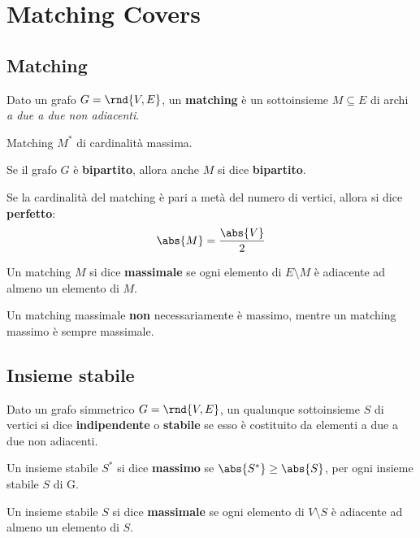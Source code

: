 \documentclass[\main/main.tex]{subfiles}
\begin{document}
\chapter{Matching Covers}

\section{Matching}
\setlength\columnsep{25pt}
\begin{multicols}{2}
  \begin{definition}
    Dato un grafo \(G=\rnd{V, E}\), un \textbf{matching} è un sottoinsieme \(M\subseteq E\) di archi \textit{a due a due non adiacenti}.
  \end{definition}
  \begin{definition}
    Matching \(M^*\) di cardinalità massima.
  \end{definition}
  \begin{definition}
    Se il grafo \(G\) è \textbf{bipartito}, allora anche \(M\) si dice \textbf{bipartito}.
  \end{definition}
  \begin{definition}
    Se la cardinalità del matching è pari a metà del numero di vertici, allora si dice \textbf{perfetto}:
    \[
      \abs{M} = \frac{\abs{V}}{2}
    \]
  \end{definition}
  \begin{definition}
    Un matching \(M\) si dice \textbf{massimale} se ogni elemento di \(E\setminus M\) è adiacente ad almeno un elemento di \(M\).

    Un matching massimale \textbf{non} necessariamente è massimo, mentre un matching massimo è sempre massimale.
  \end{definition}
\end{multicols}

\section{Insieme stabile}
\begin{definition}
  Dato un grafo simmetrico \(G=\rnd{V, E}\), un qualunque sottoinsieme \(S\) di vertici si dice \textbf{indipendente} o \textbf{stabile} se esso è costituito da elementi a due a due non adiacenti.
\end{definition}
\begin{definition}
  Un insieme stabile \(S^*\) si dice \textbf{massimo} se \(\abs{S^*} \geq \abs{S}\), per ogni insieme stabile \(S\) di G.
\end{definition}
\begin{definition}
  Un insieme stabile \(S\) si dice \textbf{massimale} se ogni elemento di \(V\setminus S\) è adiacente ad almeno un elemento di \(S\).
\end{definition}
\end{document}

